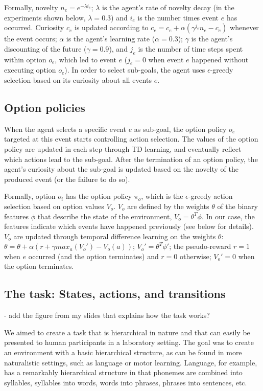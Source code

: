 \documentclass{article}
\begin{document}
Formally, novelty $n_e = e^{-\lambda i_e}$; $\lambda$ is the agent's rate of novelty decay (in the experiments shown below, $\lambda = 0.3$) and $i_e$ is the number times event $e$ has occurred.
Curiosity $c_e$ is updated according to $c_e = c_e + \alpha (\gamma^{j_e} n_e - c_e)$ whenever the event occurs; $\alpha$ is the agent's learning rate ($\alpha = 0.3$); $\gamma$ is the agent's discounting of the future ($\gamma = 0.9$), and $j_e$ is the number of time steps spent within option $o_e$, which led to event $e$ ($j_e = 0$ when event $e$ happened without executing option $o_e$).
In order to select sub-goals, the agent uses $\epsilon$-greedy selection based on its curiosity about all events $e$.

\subsection{Option policies}

When the agent selects a specific event $e$ as sub-goal, the option policy $o_e$ targeted at this event starts controlling action selection. The values of the option policy are updated in each step through TD learning, and eventually reflect which actions lead to the sub-goal. After the termination of an option policy, the agent's curiosity about the sub-goal is updated based on the novelty of the produced event (or the failure to do so).

Formally, option $o_i$ has the option policy $\pi_o$, which is the $\epsilon$-greedy action selection based on option values $V_o$. $V_o$ are defined by the weights $\theta$ of the binary features $\phi$ that describe the state of the environment, $V_o = \theta^T \phi$. In our case, the features indicate which events have happened previously (see below for details).
$V_o$ are updated through temporal difference learning on the weights $\theta$: $\theta = \theta + \alpha (r + \gamma max_a(V_o') - V_o(a))$; $V_o' = \theta^T \phi'$; the pseudo-reward $r = 1$ when $e$ occurred (and the option terminates) and $r = 0$ otherwise; $V_o' = 0$ when the option terminates. 

\subsection{The task: States, actions, and transitions}

- add the figure from my slides that explains how the task works?

We aimed to create a task that is hierarchical in nature and that can easily be presented to human participants in a laboratory setting. The goal was to create an environment with a basic hierarchical structure, as can be found in more naturalistic settings, such as language or motor learning. Language, for example, has a remarkably hierarchical structure in that phonemes are combined into syllables, syllables into words, words into phrases, phrases into sentences, etc.
\end{document}
